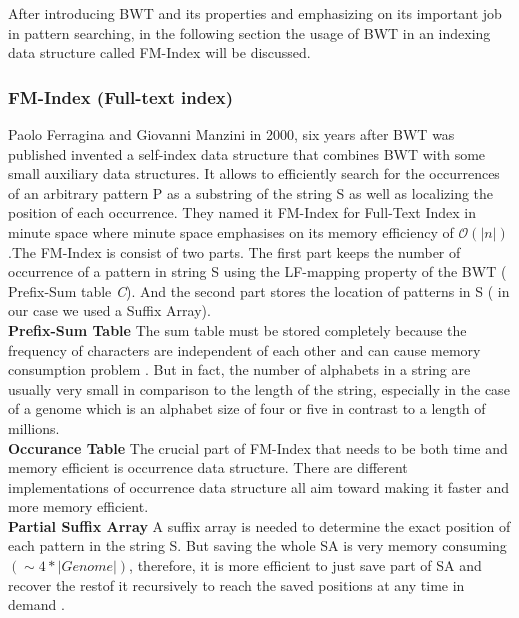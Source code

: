\documentclass[11pt,a4paper]{report}
\begin{document}
After introducing BWT and its properties and 
emphasizing on its important job in pattern 
searching, in the following section the usage 
of BWT in an indexing data structure called 
FM-Index will be discussed\cite{fmindex}. 





\subsubsection{FM-Index (Full-text index)}  
\label{FM-Index (Full-text index)}

Paolo Ferragina and Giovanni Manzini in 2000, six years after BWT was 
published invented a self-index data structure that combines BWT with 
some small auxiliary data structures. It allows to efficiently search 
for the occurrences of an arbitrary pattern P as a substring of the 
string S as well as localizing the position of each occurrence. They 
named it FM-Index for Full-Text Index in minute space where minute 
space emphasises on its memory efficiency of $\mathcal{O}(\lvert n 
\rvert)$ .The FM-Index is consist of two parts. The first part keeps 
the number of occurrence of a pattern in string S using the LF-mapping 
property of the BWT ( Prefix-Sum table \emph{C}). And the second part 
stores the location of patterns in S ( in our case we used a Suffix 
Array)\cite{Wavthesis}.\\

\textbf{Prefix-Sum Table}  The sum table must be stored completely because
the frequency of characters are independent of each other and can cause 
memory consumption problem \cite{Wavthesis}. But in  fact, the number of 
alphabets in a string are usually very small in comparison to the length 
of the string, especially in the case of a genome which is an alphabet size 
of four or five in contrast to a length of millions.
\\

\textbf{Occurance Table} The crucial part of FM-Index that needs to be 
both time and memory efficient is occurrence data structure\cite{Wavthesis}.
There are different implementations of occurrence data structure all aim 
toward making it faster and more memory efficient.
\\

\textbf{Partial Suffix Array} A suffix array is needed to determine the 
exact position of each pattern in the string S. But saving the whole SA
is very memory consuming $(\sim 4 * \lvert Genome \rvert)$, therefore, 
it is more efficient to just save part of SA and recover the restof it 
recursively to reach the saved positions at any time in demand 
\cite{Wavthesis}.\\
\end{document}
